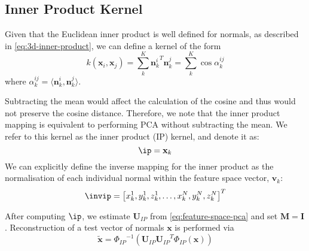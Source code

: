 \subsection{Inner Product Kernel}\label{subsec:ip-kernel}
Given that the Euclidean inner product is well defined for normals, as 
described in \cref{eq:3d-inner-product}, we can define a kernel of the form
\begin{equation}\label{eq:ip-cosine-kernel}
    k(\mathbf{x}_i, \mathbf{x}_j) = \sum^K_k {\mathbf{n}_k^i}^T \mathbf{n}_k^j = \sum^K_k \cos \alpha^{ij}_k
\end{equation}
where $\alpha^{ij}_k = \langle \mathbf{n}^i_k, \mathbf{n}^j_k \rangle$.

Subtracting the mean would affect the calculation of the cosine and thus would 
not preserve the cosine distance. Therefore, we note that the inner product 
mapping is equivalent to performing PCA without subtracting the mean. We refer 
to this kernel as the inner product (IP) kernel, and denote it as:
\begin{equation}\label{eq:ip-kernel}
    \ip = \mathbf{x}_k
\end{equation}
We can explicitly define the inverse mapping for the inner product as the 
normalisation of each individual normal within the feature space vector,
 $\mathbf{v}_k$:
\begin{equation}\label{eq:inv-ip-kernel}
    \invip = \left[ x_k^1, y_k^1, z_k^1, \ldots, x_k^N, y_k^N, z_k^N \right]^T
\end{equation}

After computing $\ip$, we estimate $\mathbf{U}_{IP}$ from 
\cref{eq:feature-space-pca} and set $\mathbf{M} = \mathbf{I}$. 
Reconstruction of a test vector of normals $\mathbf{x}$ is performed via
\begin{equation}\label{eq:ip-reconstruction}
   \tilde{\mathbf{x}} = {\Phi_{IP}}^{-1} \left( \mathbf{U}_{IP} {\mathbf{U}_{IP}}^T \Phi_{IP}(\mathbf{x}) \right)
\end{equation}
